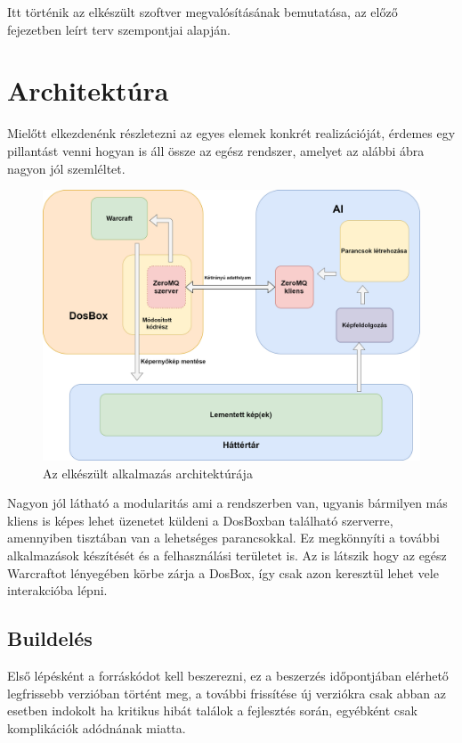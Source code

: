 
Itt történik az elkészült szoftver megvalósításának bemutatása, az előző fejezetben leírt terv szempontjai alapján.


\section{Architektúra}

Mielőtt elkezdenénk részletezni az egyes elemek konkrét realizációját, érdemes egy pillantást venni hogyan is áll össze az egész rendszer, amelyet az alábbi ábra nagyon jól szemléltet.

\begin{figure}[h]
    \centering
    \includegraphics[scale=0.22]{images/architecture.png}
    \caption{Az elkészült alkalmazás architektúrája}
    \label{fig:rect}
\end{figure}

Nagyon jól látható a modularitás ami a rendszerben van, ugyanis bármilyen más kliens is képes lehet üzenetet küldeni a DosBoxban található szerverre, amennyiben tisztában van a lehetséges parancsokkal. Ez megkönnyíti a további alkalmazások készítését és a felhasználási területet is. Az is látszik hogy az egész Warcraftot lényegében körbe zárja a DosBox, így csak azon keresztül lehet vele interakcióba lépni. 


\subsection{Buildelés}
Első lépésként a forráskódot kell beszerezni, ez a beszerzés időpontjában elérhető legfrissebb verzióban történt meg, a további frissítése új verziókra csak abban az esetben indokolt ha kritikus hibát találok a fejlesztés során, egyébként csak komplikációk adódnának miatta.

